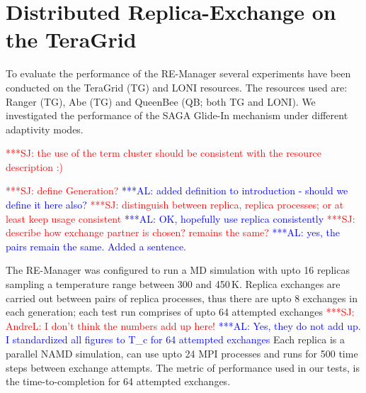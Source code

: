 \documentclass{rspublic}
\newcommand{\alnote}[1]{ {\textcolor{blue} { ***AL: #1 }}}
\newcommand{\jhanote}[1]{ {\textcolor{red} { ***SJ: #1 }}}
\newcommand{\alnote}[1]{}
\newcommand{\jhanote}[1]{}
\newcommand{\replicaagent}[1]{Replica-Agent }
\begin{document}



\section{Distributed Replica-Exchange on the TeraGrid}
\label{sec:exp}
        
To evaluate the performance of the RE-Manager several experiments have
been conducted on the TeraGrid (TG) and LONI resources. The resources
used are: Ranger (TG), Abe (TG) and QueenBee (QB; both TG and LONI).
We investigated the performance of the SAGA Glide-In mechanism under
different adaptivity modes.

\jhanote{the use of the term cluster should be consistent with the
  resource description :)}


\jhanote{define Generation?}  \alnote{added definition to introduction
  - should we define it here also?}  \jhanote{distinguish between
  replica, replica processes; or at least keep usage consistent}
\alnote{OK, hopefully use replica consistently} \jhanote{describe how
  exchange partner is chosen? remains the same?}\alnote{yes, the pairs
  remain the same. Added a sentence.}


The RE-Manager was configured to run a MD simulation with upto 16
replicas sampling a temperature range between 300 and 450\,K. Replica
exchanges are carried out between pairs of replica processes, thus
there are upto 8 exchanges in each generation; each test run comprises
of upto 64 attempted exchanges\jhanote{AndreL: I don't think the
  numbers add up here!}  \alnote{Yes, they do not add up. I
  standardized all figures to T\_c for 64 attempted exchanges} Each
replica is a parallel NAMD simulation, can use upto 24 MPI processes
and runs for 500 time steps between exchange attempts. The metric of
performance used in our tests, is the time-to-completion for 64
attempted exchanges.
\end{document}
